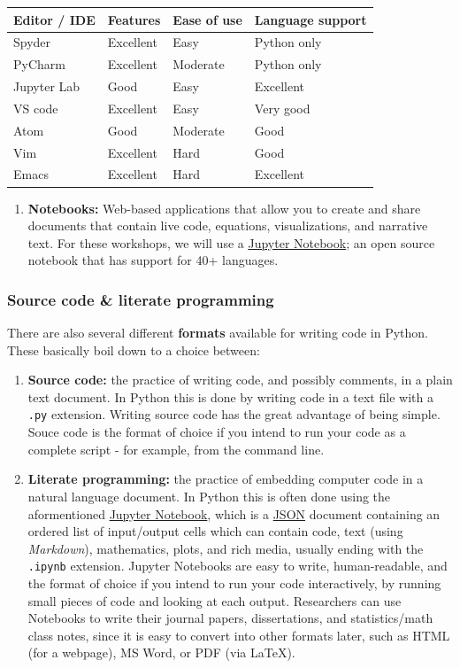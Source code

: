 \documentclass[
]{book}
\providecommand{\tightlist}{%
  \setlength{\itemsep}{0pt}\setlength{\parskip}{0pt}}
\begin{document}
\begin{longtable}[]{@{}llll@{}}
\toprule
Editor / IDE & Features & Ease of use & Language support\tabularnewline
\midrule
\endhead
Spyder & Excellent & Easy & Python only\tabularnewline
PyCharm & Excellent & Moderate & Python only\tabularnewline
Jupyter Lab & Good & Easy & Excellent\tabularnewline
VS code & Excellent & Easy & Very good\tabularnewline
Atom & Good & Moderate & Good\tabularnewline
Vim & Excellent & Hard & Good\tabularnewline
Emacs & Excellent & Hard & Excellent\tabularnewline
\bottomrule
\end{longtable}

\begin{enumerate}
\def\labelenumi{\arabic{enumi}.}
\setcounter{enumi}{1}
\tightlist
\item
  \textbf{Notebooks:} Web-based applications that allow you to create and share documents that contain live code, equations, visualizations, and narrative text. For these workshops, we will use a \href{https://jupyter.org/}{Jupyter Notebook}; an open source notebook that has support for 40+ languages.
\end{enumerate}

\hypertarget{source-code-literate-programming-1}{%
\subsubsection{Source code \& literate programming}\label{source-code-literate-programming-1}}

There are also several different \textbf{formats} available for writing code in Python.
These basically boil down to a choice between:

\begin{enumerate}
\def\labelenumi{\arabic{enumi}.}
\item
  \textbf{Source code:} the practice of writing code, and possibly comments, in a plain text document. In Python this is done by writing code in a text file with a \texttt{.py} extension. Writing source code has the great advantage of being simple. Souce code is the format of choice if you intend to run your code as a complete script - for example, from the command line.
\item
  \textbf{Literate programming:} the practice of embedding computer code in a natural language document. In Python this is often done using the aformentioned \href{https://jupyter.org/}{Jupyter Notebook}, which is a \href{https://www.json.org/json-en.html}{JSON} document containing an ordered list of input/output cells which can contain code, text (using \emph{Markdown}), mathematics, plots, and rich media, usually ending with the \texttt{.ipynb} extension. Jupyter Notebooks are easy to write, human-readable, and the format of choice if you intend to run your code interactively, by running small pieces of code and looking at each output. Researchers can use Notebooks to write their journal papers, dissertations, and statistics/math class notes, since it is easy to convert into other formats later, such as HTML (for a webpage), MS Word, or PDF (via LaTeX).
\end{enumerate}
\end{document}
